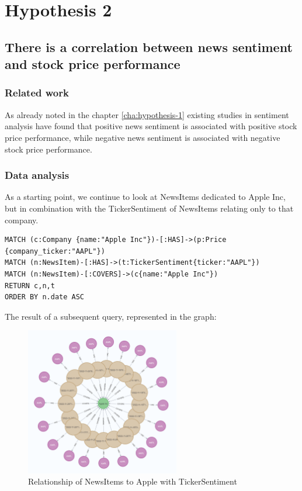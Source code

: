 \newpage
\section{Hypothesis 2}
\label{cha:hypothesis-2}
\subsection{There is a correlation between news sentiment and stock price performance}
\subsubsection{Related work}
As already noted in the chapter \ref{cha:hypothesis-1}
existing studies in sentiment analysis have found that positive news sentiment is associated with positive stock price performance, while negative news sentiment is associated with negative stock price performance.\cite{kalyani2016stock}
\subsubsection{Data analysis}
As a starting point, we continue to look at NewsItems dedicated to Apple Inc, but in combination with the TickerSentiment of NewsItems relating only to that company. 
\begin{lstlisting}[caption={Relationship of NewsItems to Apple Stock with TickerSentiment}, label={lst:newsItems_tickerSentiment_apple},captionpos=b]
MATCH (c:Company {name:"Apple Inc"})-[:HAS]->(p:Price {company_ticker:"AAPL"})
MATCH (n:NewsItem)-[:HAS]->(t:TickerSentiment{ticker:"AAPL"})
MATCH (n:NewsItem)-[:COVERS]->(c{name:"Apple Inc"})
RETURN c,n,t
ORDER BY n.date ASC
\end{lstlisting}

The result of a subsequent query, represented in the graph:
\begin{figure}[h]
 \centering
 \includegraphics[width=0.6\textwidth]{images/apple_news_ticker_sentiment_graph.png}
 \caption{Relationship of NewsItems to Apple with TickerSentiment }
 \label{fig:apple_news_ticker_sentiment_graph}
\end{figure}

